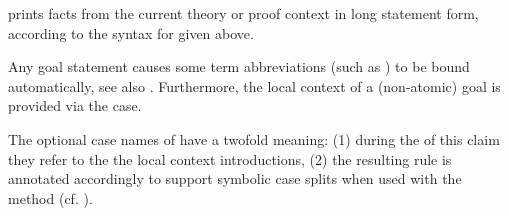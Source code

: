 \begin{isabellebody}
\begin{isamarkuptext}
\begin{descr}
  \item [\isa{\isacommand{print{\isacharunderscore}statement}}~\isa{a}] prints facts from the
  current theory or proof context in long statement form, according to
  the syntax for  given above.

  \end{descr}

  Any goal statement causes some term abbreviations (such as
  ) to be bound automatically, see also
  .  Furthermore, the local context of a
  (non-atomic) goal is provided via the  case.

  The optional case names of  have a twofold
  meaning: (1) during the of this claim they refer to the the local
  context introductions, (2) the resulting rule is annotated
  accordingly to support symbolic case splits when used with the
   method (cf.  ).

  \medskip


\end{isamarkuptext}
\end{isabellebody}
